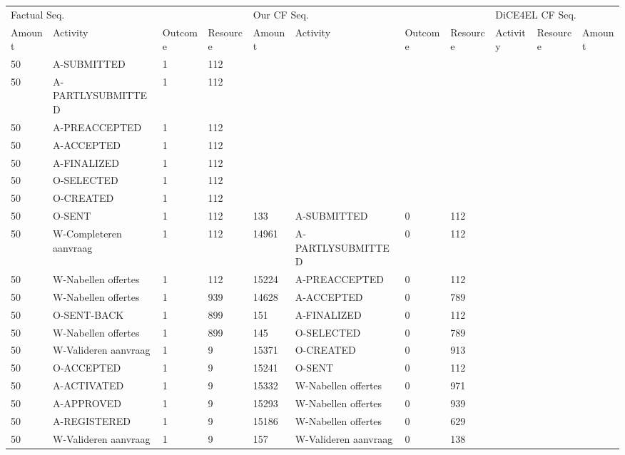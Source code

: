\begin{tabular}{lllllllllll}
\toprule
\multicolumn{4}{l}{Factual Seq.} & \multicolumn{4}{l}{Our CF Seq.} & \multicolumn{3}{l}{DiCE4EL CF Seq.} \\
Amount & Activity & Outcome & Resource & Amount & Activity & Outcome & Resource & Activity & Resource & Amount \\
\midrule
50 & A-SUBMITTED & 1 & 112 &  &  &  &  &  &  &  \\
50 & A-PARTLYSUBMITTED & 1 & 112 &  &  &  &  &  &  &  \\
50 & A-PREACCEPTED & 1 & 112 &  &  &  &  &  &  &  \\
50 & A-ACCEPTED & 1 & 112 &  &  &  &  &  &  &  \\
50 & A-FINALIZED & 1 & 112 &  &  &  &  &  &  &  \\
50 & O-SELECTED & 1 & 112 &  &  &  &  &  &  &  \\
50 & O-CREATED & 1 & 112 &  &  &  &  &  &  &  \\
50 & O-SENT & 1 & 112 & 133 & A-SUBMITTED & 0 & 112 &  &  &  \\
50 & W-Completeren aanvraag & 1 & 112 & 14961 & A-PARTLYSUBMITTED & 0 & 112 &  &  &  \\
50 & W-Nabellen offertes & 1 & 112 & 15224 & A-PREACCEPTED & 0 & 112 &  &  &  \\
50 & W-Nabellen offertes & 1 & 939 & 14628 & A-ACCEPTED & 0 & 789 &  &  &  \\
50 & O-SENT-BACK & 1 & 899 & 151 & A-FINALIZED & 0 & 112 &  &  &  \\
50 & W-Nabellen offertes & 1 & 899 & 145 & O-SELECTED & 0 & 789 &  &  &  \\
50 & W-Valideren aanvraag & 1 & 9 & 15371 & O-CREATED & 0 & 913 &  &  &  \\
50 & O-ACCEPTED & 1 & 9 & 15241 & O-SENT & 0 & 112 &  &  &  \\
50 & A-ACTIVATED & 1 & 9 & 15332 & W-Nabellen offertes & 0 & 971 &  &  &  \\
50 & A-APPROVED & 1 & 9 & 15293 & W-Nabellen offertes & 0 & 939 &  &  &  \\
50 & A-REGISTERED & 1 & 9 & 15186 & W-Nabellen offertes & 0 & 629 &  &  &  \\
50 & W-Valideren aanvraag & 1 & 9 & 157 & W-Valideren aanvraag & 0 & 138 &  &  &  \\
\bottomrule
\end{tabular}
